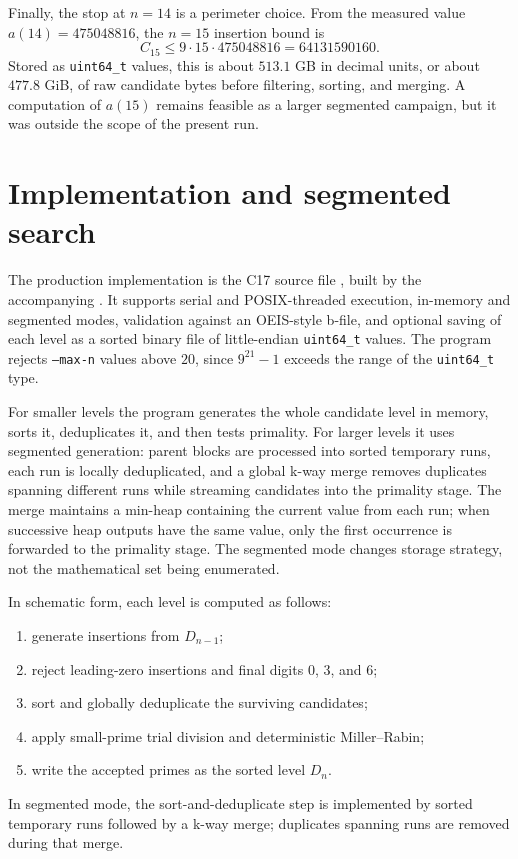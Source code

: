 \documentclass[11pt]{article}
\theoremstyle{definition}
\theoremstyle{remark}
\begin{document}
Finally, the stop at \(n=14\) is a perimeter choice.  From the measured value
\(a(14)=475048816\), the \(n=15\) insertion bound is
\[
  C_{15}\leq 9\cdot 15\cdot 475048816=64131590160.
\]
Stored as \texttt{uint64\_t} values, this is about \(513.1\) GB in decimal
units, or about \(477.8\) GiB, of raw candidate bytes before filtering,
sorting, and merging.  A computation of \(a(15)\) remains feasible as a
larger segmented campaign, but it was outside the scope of the present run.

\section{Implementation and segmented search}
\label{sec:impl}

The production implementation is the C17 source file ,
built by the accompanying .  It supports serial and
POSIX-threaded execution, in-memory and segmented modes, validation against
an OEIS-style b-file, and optional saving of each level as a sorted binary
file of little-endian \texttt{uint64\_t} values.  The program rejects
\texttt{--max-n} values above \(20\), since \(9^{21}-1\) exceeds the range
of the \texttt{uint64\_t} type.

For smaller levels the program generates the whole candidate level in
memory, sorts it, deduplicates it, and then tests primality.  For larger
levels it uses segmented generation: parent blocks are processed into sorted
temporary runs, each run is locally deduplicated, and a global k-way merge
removes duplicates spanning different runs while streaming candidates into
the primality stage.  The merge maintains a min-heap containing the current
value from each run; when successive heap outputs have the same value, only
the first occurrence is forwarded to the primality stage.  The segmented mode
changes storage strategy, not the mathematical set being enumerated.

In schematic form, each level is computed as follows:
\begin{enumerate}
\item generate insertions from \(D_{n-1}\);
\item reject leading-zero insertions and final digits \(0\), \(3\), and \(6\);
\item sort and globally deduplicate the surviving candidates;
\item apply small-prime trial division and deterministic Miller--Rabin;
\item write the accepted primes as the sorted level \(D_n\).
\end{enumerate}
In segmented mode, the sort-and-deduplicate step is implemented by sorted
temporary runs followed by a k-way merge; duplicates spanning runs are
removed during that merge.
\end{document}
